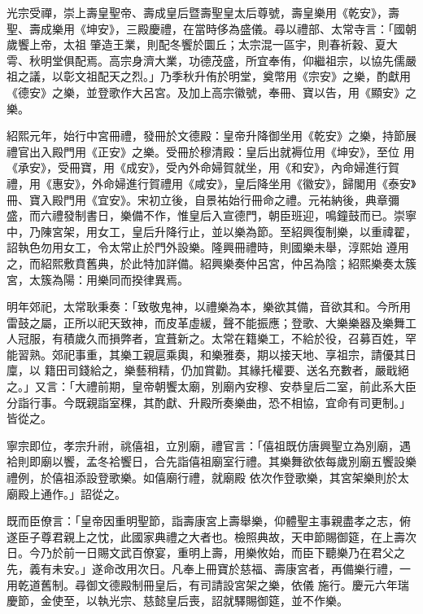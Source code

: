 
\begin{pinyinscope}

 光宗受禪，崇上壽皇聖帝、壽成皇后暨壽聖皇太后尊號，壽皇樂用《乾安》，壽聖、壽成樂用《坤安》，三殿慶禮，在當時侈為盛儀。尋以禮部、太常寺言：「國朝歲饗上帝，太祖
 肇造王業，則配冬饗於圜丘；太宗混一區宇，則春祈穀、夏大雩、秋明堂俱配焉。高宗身濟大業，功德茂盛，所宜奉侑，仰繼祖宗，以協先儒嚴祖之議，以彰文祖配天之烈。」乃季秋升侑於明堂，奠幣用《宗安》之樂，酌獻用《德安》之樂，並登歌作大呂宮。及加上高宗徽號，奉冊、寶以告，用《顯安》之樂。



 紹熙元年，始行中宮冊禮，發冊於文德殿：皇帝升降御坐用《乾安》之樂，持節展禮官出入殿門用《正安》之樂。受冊於穆清殿：皇后出就褥位用《坤安》，至位
 用《承安》，受冊寶，用《成安》，受內外命婦賀就坐，用《和安》，內命婦進行賀禮，用《惠安》，外命婦進行賀禮用《咸安》，皇后降坐用《徽安》，歸閣用《泰安》冊、寶入殿門用《宜安》。宋初立後，自景祐始行冊命之禮。元祐納後，典章彌盛，而六禮發制書日，樂備不作，惟皇后入宣德門，朝臣班迎，鳴鐘鼓而已。崇寧中，乃陳宮架，用女工，皇后升降行止，並以樂為節。至紹興復制樂，以重禕翟，詔執色勿用女工，令太常止於門外設樂。隆興冊禮時，則國樂未舉，淳熙始
 遵用之，而紹熙敷賁舊典，於此特加詳備。紹興樂奏仲呂宮，仲呂為陰；紹熙樂奏太簇宮，太簇為陽：用樂同而揆律異焉。



 明年郊祀，太常耿秉奏：「致敬鬼神，以禮樂為本，樂欲其備，音欲其和。今所用雷鼓之屬，正所以祀天致神，而皮革虛緩，聲不能振應；登歌、大樂樂器及樂舞工人冠服，有積歲久而損弊者，宜葺新之。太常在籍樂工，不給於役，召募百姓，罕能習熟。郊祀事重，其樂工親扈乘輿，和樂雅奏，期以接天地、享祖宗，請優其日廩，以
 籍田司錢給之，樂藝稍精，仍加賞勸。其緣托權要、送名充數者，嚴戢絕之。」又言：「大禮前期，皇帝朝饗太廟，別廟內安穆、安恭皇后二室，前此系大臣分詣行事。今既親詣室稞，其酌獻、升殿所奏樂曲，恐不相協，宜命有司更制。」皆從之。



 寧宗即位，孝宗升祔，祧僖祖，立別廟，禮官言：「僖祖既仿唐興聖立為別廟，遇袷則即廟以饗，孟冬袷饗日，合先詣僖祖廟室行禮。其樂舞欲依每歲別廟五饗設樂禮例，於僖祖添設登歌樂。如僖廟行禮，就廟殿
 依次作登歌樂，其宮架樂則於太廟殿上通作。」詔從之。



 既而臣僚言：「皇帝因重明聖節，詣壽康宮上壽舉樂，仰體聖主事親盡孝之志，俯遂臣子尊君親上之忱，此國家典禮之大者也。檢照典故，天申節賜御筵，在上壽次日。今乃於前一日賜文武百僚宴，重明上壽，用樂攸始，而臣下聽樂乃在君父之先，義有未安。」遂命改用次日。凡奉上冊寶於慈福、壽康宮者，再備樂行禮，一用乾道舊制。尋御文德殿制冊皇后，有司請設宮架之樂，依儀
 施行。慶元六年瑞慶節，金使至，以執光宗、慈懿皇后喪，詔就驛賜御筵，並不作樂。




\end{pinyinscope}
